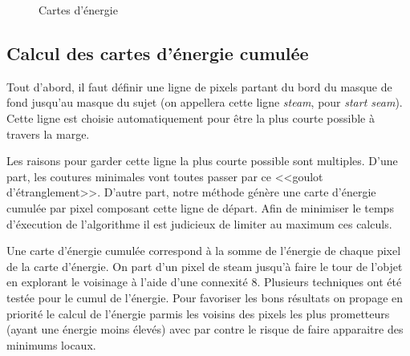 \documentclass[a4paper]{article}
\begin{document}
\begin{figure}[!ht]%
    \centering
    \hspace{0.030\textwidth}
    \caption{Cartes d'énergie}
    \label{energie}
\end{figure}

\subsection{Calcul des cartes d'énergie cumulée}

Tout d'abord, il faut définir une ligne de pixels partant du bord du masque de fond jusqu'au masque du sujet (on appellera
cette ligne {\em steam}, pour {\em start seam}). %
Cette ligne est choisie automatiquement pour être la plus courte possible à travers la marge.

Les raisons pour garder cette ligne la plus courte possible sont multiples. D'une part, les coutures minimales
vont toutes passer par ce <<goulot d'étranglement>>. D'autre part, notre méthode génère une carte d'énergie
cumulée par pixel composant cette ligne de départ. Afin de minimiser le temps d'éxecution de l'algorithme il
est judicieux de limiter au maximum ces calculs.

Une carte d’énergie cumulée correspond à la somme de l'énergie de chaque pixel de la carte d'énergie. 
On part d’un pixel de steam jusqu’à faire le tour de l’objet en explorant le voisinage à l'aide d'une connexité 8.
Plusieurs techniques ont été testée pour le cumul de l'énergie. Pour favoriser les bons résultats on propage
en priorité le calcul de l'énergie parmis les voisins des pixels les plus prometteurs (ayant une énergie moins élevés) 
avec par contre le risque de faire apparaitre des minimums locaux.
\end{document}
